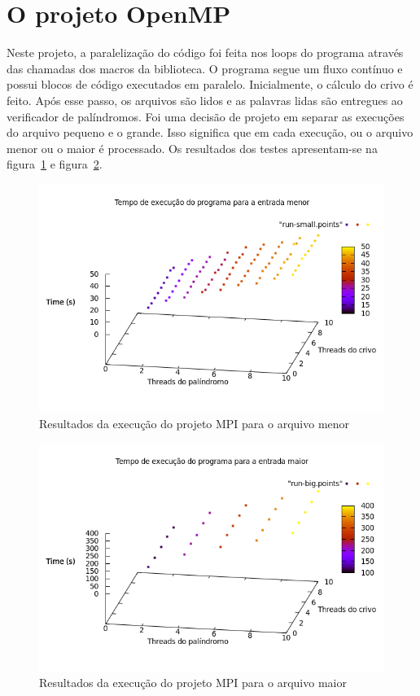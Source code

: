 \documentclass[a4paper]{article}
\begin{document}
\section{O projeto OpenMP}
\indent \indent Neste projeto, a paralelização do código foi feita nos loops do programa através das chamadas dos macros da biblioteca. O programa segue um fluxo contínuo e possui blocos de código executados em paralelo. Inicialmente, o cálculo do crivo é feito. Após esse passo, os arquivos são lidos e as palavras lidas são entregues ao verificador de palíndromos. Foi uma decisão de projeto em separar as execuções do arquivo pequeno e o grande. Isso significa que em cada execução, ou o arquivo menor ou o maior é processado. Os resultados dos testes apresentam-se na figura~\ref{graph-openmp-small} e figura~\ref{graph-openmp-big}.
\begin{figure}[float=p]
	\includegraphics[scale=0.5]{graph-openmp-small}
	\caption{Resultados da execução do projeto MPI para o arquivo menor}
	\label{graph-openmp-small}
\end{figure}
\begin{figure}[float=p]
	\includegraphics[scale=0.5]{graph-openmp-big}
	\caption{Resultados da execução do projeto MPI para o arquivo maior}
	\label{graph-openmp-big}
\end{figure}
\end{document}
